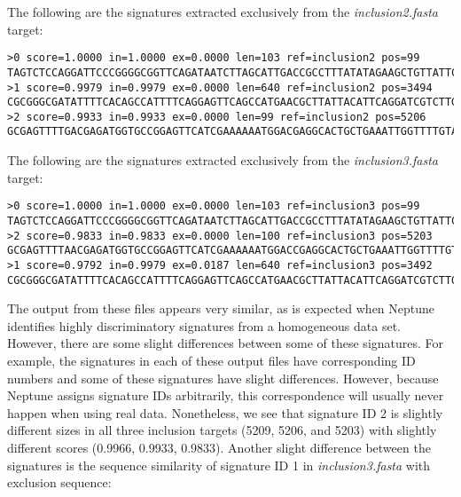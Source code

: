 \documentclass[a4paper,10pt]{article}
\begin{document}
The following are the signatures extracted exclusively from the \textit{inclusion2.fasta} target:

\begin{minipage}{\linewidth}
\begin{lstlisting}[frame=single, style=bash, title=output/sorted/inclusion2.fasta]
>0 score=1.0000 in=1.0000 ex=0.0000 len=103 ref=inclusion2 pos=99
TAGTCTCCAGGATTCCCGGGGCGGTTCAGATAATCTTAGCATTGACCGCCTTTATATAGAAGCTGTTATTCAAGAAGCAT...
>1 score=0.9979 in=0.9979 ex=0.0000 len=640 ref=inclusion2 pos=3494
CGCGGGCGATATTTTCACAGCCATTTTCAGGAGTTCAGCCATGAACGCTTATTACATTCAGGATCGTCTTGAGGCTCAGA...
>2 score=0.9933 in=0.9933 ex=0.0000 len=99 ref=inclusion2 pos=5206
GCGAGTTTTGACGAGATGGTGCCGGAGTTCATCGAAAAAATGGACGAGGCACTGCTGAAATTGGTTTTGTATTTGGGGAG...
\end{lstlisting}
\end{minipage}

The following are the signatures extracted exclusively from the \textit{inclusion3.fasta} target:

\begin{minipage}{\linewidth}
\begin{lstlisting}[frame=single, style=bash, title=output/sorted/inclusion3.fasta]
>0 score=1.0000 in=1.0000 ex=0.0000 len=103 ref=inclusion3 pos=99
TAGTCTCCAGGATTCCCGGGGCGGTTCAGATAATCTTAGCATTGACCGCCTTTATATAGAAGCTGTTATTCAAGAAGCAT...
>2 score=0.9833 in=0.9833 ex=0.0000 len=100 ref=inclusion3 pos=5203
GCGAGTTTTAACGAGATGGTGCCGGAGTTCATCGAAAAAATGGACCGAGGCACTGCTGAAATTGGTTTTGTATTTGGGGA...
>1 score=0.9792 in=0.9979 ex=0.0187 len=640 ref=inclusion3 pos=3492
CGCGGGCGATATTTTCACAGCCATTTTCAGGAGTTCAGCCATGAACGCTTATTACATTCAGGATCGTCTTGAGGCTCAGA...
\end{lstlisting}
\end{minipage}

The output from these files appears very similar, as is expected when Neptune identifies highly discriminatory signatures from a homogeneous data set. However, there are some slight differences between some of these signatures. For example, the signatures in each of these output files have corresponding ID numbers and some of these signatures have slight differences. However, because Neptune assigns signature IDs arbitrarily, this correspondence will usually never happen when using real data. Nonetheless, we see that signature ID 2 is slightly different sizes in all three inclusion targets (5209, 5206, and 5203) with slightly different scores (0.9966, 0.9933, 0.9833). Another slight difference between the signatures is the sequence similarity of signature ID 1 in \textit{inclusion3.fasta} with exclusion sequence:
\end{document}
